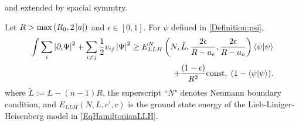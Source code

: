  and extended by spacial symmtry.
	\begin{lemma}\label{LemmaNormBoundEpsilonSpin1/2Fermi}
	Let $R>\max\left(R_0,2\left\lvert a \right\rvert\right) $ and $ \epsilon\in[0,1] $. For $ \psi $ defined in \eqref{Definition:psi},
	\begin{equation}
	\begin{aligned}
	\int \sum_{i}\left\lvert \partial_i\Psi \right\rvert^2+\sum_{i\neq j} \frac{1}{2}v_{ij}\left\lvert \Psi \right\rvert^2\geq E_{LLH}^N \left(N,\tilde{L},\frac{2\epsilon}{R-a_e},\frac{2\epsilon}{R-a_o}\right)\left\langle\psi|\psi\right\rangle\\+ \frac{(1-\epsilon)}{R^2}\textnormal{const. }(1-\left\langle\psi|\psi\right\rangle).
	\end{aligned}
	\end{equation}
	where $ \tilde{L}:=L-(n-1)R $, the superscript ``$ N $" denotes Neumann boundary condition, and $ E_{LLH}(N,L,c',c) $ is the ground state energy of the Lieb-Liniger-Heisenberg model in \eqref{EqHamiltonianLLH}.
\end{lemma}

